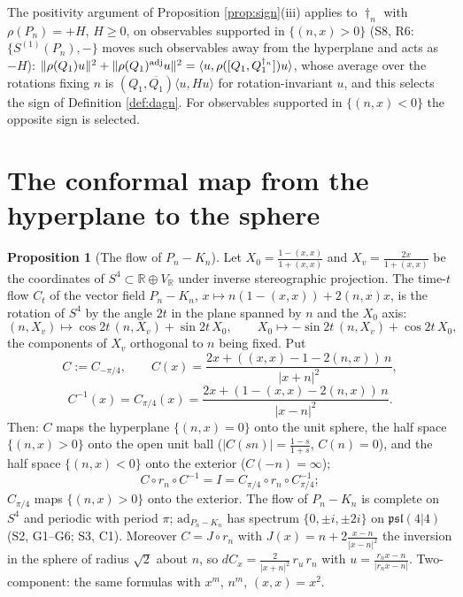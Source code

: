 \documentclass[11pt]{article}
\theoremstyle{definition}
\newtheorem{proposition}[definition]{Proposition}
\begin{document}
The positivity argument of Proposition \ref{prop:sign}(iii) applies to $\dagger_n$ with $\rho(P_n)=+H$, $H\ge0$, on observables supported in $\{(n,x)>0\}$ (S8, R6: $\{S^{(1)}(P_n),-\}$ moves such observables away from the hyperplane and acts as $-H$): $\|\rho(Q_1)u\|^2+\|\rho(Q_1)^{\rm adj}u\|^2=\langle u,\rho([Q_1,Q_1^{\dagger_n}])u\rangle$, whose average over the rotations fixing $n$ is $(Q_1,\overline{Q_1})\langle u,Hu\rangle$ for rotation-invariant $u$, and this selects the sign of Definition \ref{def:dagn}. For observables supported in $\{(n,x)<0\}$ the opposite sign is selected.

\section{The conformal map from the hyperplane to the sphere}
\label{sec:C}

\begin{proposition}[The flow of $P_n-K_n$]
\label{prop:C}
Let $X_0=\frac{1-(x,x)}{1+(x,x)}$ and $X_v=\frac{2x}{1+(x,x)}$ be the coordinates of $S^4\subset\mathbb R\oplus V_{\mathbb R}$ under inverse stereographic projection. The time-$t$ flow $C_t$ of the vector field $P_n-K_n$, $x\mapsto n(1-(x,x))+2(n,x)x$, is the rotation of $S^4$ by the angle $2t$ in the plane spanned by $n$ and the $X_0$ axis:
\[
(n,X_v)\mapsto\cos2t\,(n,X_v)+\sin2t\,X_0,\qquad X_0\mapsto-\sin2t\,(n,X_v)+\cos2t\,X_0,
\]
the components of $X_v$ orthogonal to $n$ being fixed. Put
\[
C:=C_{-\pi/4},\qquad C(x)=\frac{2x+((x,x)-1-2(n,x))\,n}{|x+n|^2},\]\[C^{-1}(x)=C_{\pi/4}(x)=\frac{2x+(1-(x,x)-2(n,x))\,n}{|x-n|^2}.
\]
Then: $C$ maps the hyperplane $\{(n,x)=0\}$ onto the unit sphere, the half space $\{(n,x)>0\}$ onto the open unit ball ($|C(sn)|=\frac{1-s}{1+s}$, $C(n)=0$), and the half space $\{(n,x)<0\}$ onto the exterior ($C(-n)=\infty$);
\[
C\circ r_n\circ C^{-1}=I=C_{\pi/4}\circ r_n\circ C_{\pi/4}^{-1};
\]
$C_{\pi/4}$ maps $\{(n,x)>0\}$ onto the exterior. The flow of $P_n-K_n$ is complete on $S^4$ and periodic with period $\pi$; $\mathrm{ad}_{P_n-K_n}$ has spectrum $\{0,\pm i,\pm2i\}$ on $\mathfrak{psl}(4|4)$ (S2, G1--G6; S3, C1). Moreover $C=J\circ r_n$ with $J(x)=n+2\frac{x-n}{|x-n|^2}$ the inversion in the sphere of radius $\sqrt2$ about $n$, so $dC_x=\frac{2}{|x+n|^2}\,r_u\,r_n$ with $u=\frac{r_nx-n}{|r_nx-n|}$. Two-component: the same formulas with $x^m$, $n^m$, $(x,x)=x^2$.
\end{proposition}
\end{document}
